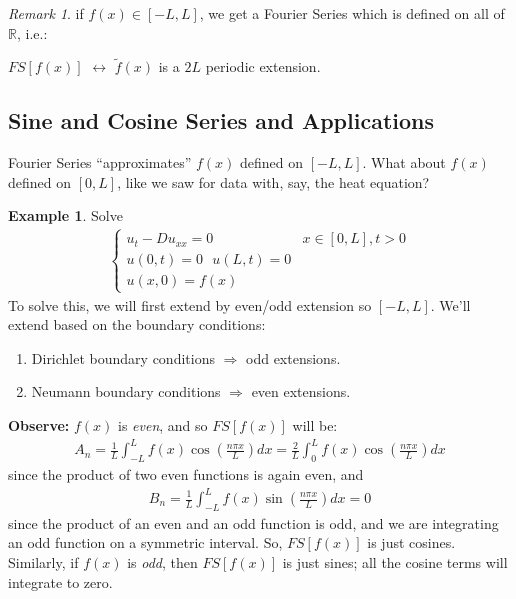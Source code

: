 \documentclass[11pt]{scrartcl}
\theoremstyle{definition}
\newtheorem{ex}{Example}
\theoremstyle{remark}
\newtheorem{remark}{Remark}
\newcommand{\idx}[2]{\int_{#1}^{#2}}
\newcommand{\R}[0]{\mathbb{R}}
\begin{document}
\begin{remark}
	if $f (x) \in [-L,L]$, we get a Fourier Series which is defined on all of $\R$, i.e.: 
	\begin{center}
		$FS[f(x)]$ $\leftrightarrow$ $\tilde{f}(x)$ is a $2L$ periodic extension.
	\end{center}	
\end{remark}

\subsection{Sine and Cosine Series and Applications}
Fourier Series ``approximates'' $f(x)$ defined on $[-L, L]$. What about $f(x)$ defined on $[0,L]$, like we saw for data with, say, the heat equation?

\begin{ex}
	Solve 
	\begin{align*}
		\begin{cases}
			u_t - Du_{xx} = 0 & x \in [0,L], t > 0  \\
			u(0,t) = 0 \text{ } u(L,t) = 0 \\
			u(x,0) = f(x) 
		\end{cases}
	\end{align*}
	To solve this, we will first extend by even/odd extension so $[-L, L]$. We'll extend based on the boundary conditions:
	\begin{enumerate}[noitemsep]
		\item Dirichlet boundary conditions $\Rightarrow$ odd extensions. 
		\item Neumann boundary conditions $\Rightarrow$ even extensions.
	\end{enumerate}
	\textbf{Observe:} $f(x)$ is \emph{even}, and so $FS[f(x)]$ will be: 
	\begin{align*}
		A_n = \frac{1}{L} \idx{-L}{L} f(x) \cos \left( \frac{n \pi x}{L} \right) dx = \frac{2}{L} \idx{0}{L} f(x) \cos \left( \frac{n \pi x}{L} \right) dx 
	\end{align*}
	since the product of two even functions is again even, and
	\begin{align*}
		B_n = \frac{1}{L} \idx{-L}{L} f(x) \sin \left( \frac{n \pi x}{L} \right) dx = 0 
	\end{align*}
	since the product of an even and an odd function is odd, and we are integrating an odd function on a symmetric interval. So, $FS[f(x)]$ is just cosines. Similarly, if $f(x)$ is \emph{odd}, then $FS[f(x)]$ is just sines; all the cosine terms will integrate to zero.
\end{ex}
\end{document}
